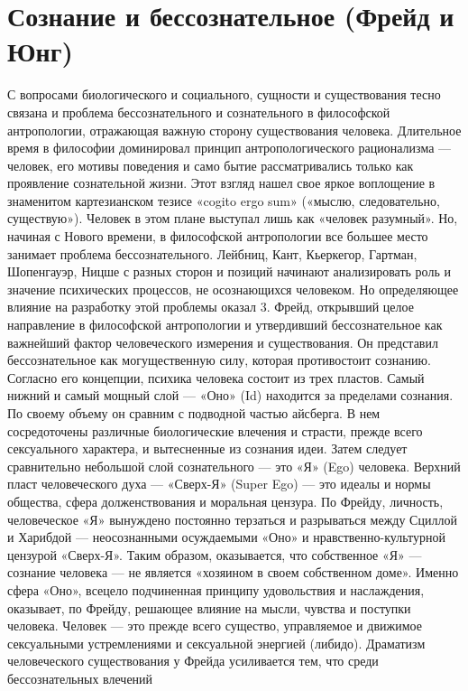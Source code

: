 \documentclass[12pt]{article}
\begin{document}
\section{Сознание и бессознательное (Фрейд и Юнг)}
С  вопросами  биологического  и  социального,  сущности  и  существования  тесно  связана  и  проблема
бессознательного и сознательного в философской антропологии, отражающая важную сторону существования
человека.
Длительное  время  в  философии  доминировал  принцип  антропологического  рационализма  —  человек,  его
мотивы поведения и само бытие рассматривались только как проявление сознательной жизни. Этот взгляд
нашел свое яркое воплощение в знаменитом картезианском тезисе «cogito ergo sum» («мыслю, следовательно,
существую»). Человек в этом плане выступал лишь как «человек разумный». Но, начиная с Нового времени, в
философской антропологии все большее место занимает проблема бессознательного.
Лейбниц, Кант, Кьеркегор, Гартман, Шопенгауэр, Ницше с разных сторон и позиций начинают анализировать
роль и значение психических процессов, не осознающихся человеком.
Но определяющее влияние на разработку этой проблемы оказал 3. Фрейд, открывший целое направление в
философской антропологии и утвердивший бессознательное как важнейший фактор человеческого измерения и
существования. Он представил бессознательное как могущественную силу, которая противостоит сознанию.
Согласно его концепции, психика человека состоит из трех пластов. Самый нижний и самый мощный слой —
«Оно» (Id) находится за пределами сознания. По своему объему он сравним с подводной частью айсберга. В
нем  сосредоточены  различные  биологические влечения и страсти,  прежде  всего сексуального  характера, и
вытесненные из сознания идеи. Затем следует сравнительно небольшой слой сознательного — это «Я» (Ego)
человека. Верхний пласт человеческого духа — «Сверх-Я» (Super Ego) — это идеалы и нормы общества, сфера
долженствования  и  моральная  цензура.  По  Фрейду,  личность,  человеческое  «Я»  вынуждено  постоянно
терзаться и разрываться между Сциллой и Харибдой — неосознанными осуждаемыми «Оно» и нравственно-культурной цензурой «Сверх-Я». Таким образом, оказывается, что собственное «Я» — сознание человека — не
является  «хозяином  в  своем  собственном  доме».  Именно  сфера  «Оно»,  всецело  подчиненная  принципу
удовольствия и наслаждения, оказывает, по Фрейду, решающее влияние на мысли, чувства и поступки человека.
Человек — это прежде всего существо, управляемое и движимое сексуальными устремлениями и сексуальной
энергией (либидо).
Драматизм  человеческого  существования  у  Фрейда  усиливается  тем,  что  среди  бессознательных  влечений
\end{document}
